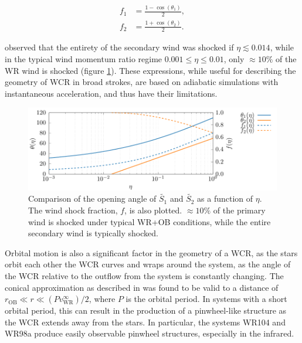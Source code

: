 \begin{subequations}
  \label{eq:windshockfraction}
  \begin{align}
    f_1 & = \frac{1 - \cos\left(\theta_1\right)}{2} , \\
    f_2 & = \frac{1 + \cos\left(\theta_2\right)}{2} .
  \end{align}
\end{subequations}

\noindent
\textcite{pittardCollidingStellarWinds2018} observed that the entirety of the secondary wind was shocked if $\eta \lesssim 0.014$, while in the typical wind momentum ratio regime $0.001 \leq \eta \leq 0.01$, only $\approx 10\%$ of the WR wind is shocked (figure \ref{fig:wind-shock-factor}).
These expressions, while useful for describing the geometry of WCR in broad strokes, are based on adiabatic simulations with instantaneous acceleration, and thus have their limitations.

\begin{figure}
  \centering
  \includegraphics[]{assets/wind-shock-factor/shock-factor.pdf}
  \caption[Wind shock fraction, as a function of $\eta$]{Comparison of the opening angle of $\widetilde{S_1}$ and $\widetilde{S_2}$ as a function of $\eta$. The wind shock fraction, $f$, is also plotted. $\approx 10\%$ of the primary wind is shocked under typical WR+OB conditions, while the entire secondary wind is typically shocked.}
  \label{fig:wind-shock-factor}
\end{figure}

Orbital motion is also a significant factor in the geometry of a WCR, as the stars orbit each other the WCR curves and wraps around the system, as the angle of the WCR relative to the outflow from the system is constantly changing.
The conical approximation as described in \textcite{eichler_particle_1993} was found to be valid to a distance of $r_\text{OB} \ll r \ll (P v^\infty_\text{WR})/2$, where $P$ is the orbital period.
In systems with a short orbital period, this can result in the production of a pinwheel-like structure as the WCR extends away from the stars.
In particular, the systems WR104 and WR98a produce easily observable pinwheel structures, especially in the infrared.

